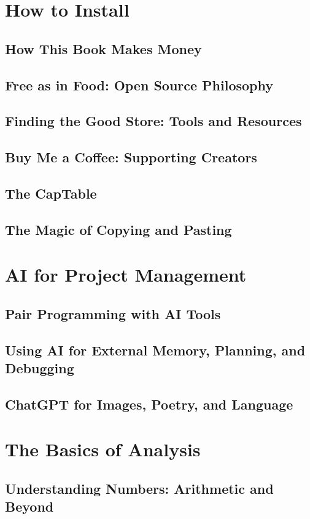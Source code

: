 \chapter{How to Install}
\section{How This Book Makes Money}
\section{Free as in Food: Open Source Philosophy}
\section{Finding the Good Store: Tools and Resources}
\section{Buy Me a Coffee: Supporting Creators}
\section{The CapTable}
\section{The Magic of Copying and Pasting}

\chapter{AI for Project Management}
\section{Pair Programming with AI Tools}
\section{Using AI for External Memory, Planning, and Debugging}
\section{ChatGPT for Images, Poetry, and Language}

\chapter{The Basics of Analysis}
\section{Understanding Numbers: Arithmetic and Beyond}
